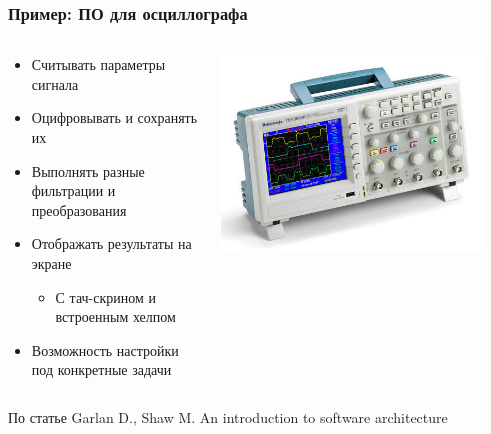 \documentclass{../../slides-style}
\begin{document}
    \begin{frame}
        \frametitle{Пример: ПО для осциллографа}
        \begin{columns}
            \begin{column}{0.6\textwidth}
                \begin{itemize}
                    \item Считывать параметры сигнала
                    \item Оцифровывать и сохранять их
                    \item Выполнять разные фильтрации и преобразования
                    \item Отображать результаты на экране
                    \begin{itemize}
                        \item С тач-скрином и встроенным хелпом
                    \end{itemize}
                    \item Возможность настройки под конкретные задачи
                \end{itemize}
            \end{column}
            \begin{column}{0.4\textwidth}
                \begin{center}
                    \includegraphics[width=0.9\textwidth]{oscilloscope.png}
                \end{center}
            \end{column}
        \end{columns}
        \vspace{1cm}
        \begin{tiny}
            По статье Garlan D., Shaw M. An introduction to software architecture
        \end{tiny}
    \end{frame}
\end{document}
